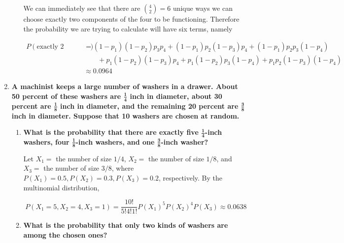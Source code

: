\documentclass[10pt, oneside]{article}   	%
\theoremstyle{definition}
\begin{document}
\begin{enumerate}[label=8.\arabic*]
\begin{enumerate}
	We can immediately see that there are $\binom{4}{2} = 6$ unique ways we can choose exactly two components of the four to be functioning. Therefore the probability we are trying to calculate will have six terms, namely
	
	\begin{align*}
	P(\text{exactly 2 components are functioning}) &= (1-p_1)(1-p_2) p_3 p_4 + (1-p_1) p_2 (1-p_3) p_4 + (1-p_1) p_2 p_3 (1-p_4) \\
	&\quad \quad + p_1 (1-p_2) (1-p_3) p_4 + p_1 (1-p_2) p_3 (1-p_4) + p_1 p_2 (1-p_3) (1 - p_4) \\
	&\approx \boxed{0.0964}
	\end{align*}
	
	
	\end{enumerate}

\item  \begin{tcolorbox}[
  colback=Cerulean!5!white,
  colframe=Cerulean!75!black]
\textbf{A machinist keeps a large number of washers in a drawer. About 50 percent of these washers are $\bm{\frac{1}{4}}$ inch in diameter, about 30 percent are $\bm{\frac{1}{8}}$ inch in diameter, and the remaining 20 percent are $\bm{\frac{3}{8}}$ inch in diameter. Suppose that 10 washers are chosen at random.}
\end{tcolorbox}

	\begin{enumerate}
	\item  \begin{tcolorbox}[
	  colback=Cerulean!5!white,
	  colframe=Cerulean!75!black]
	\textbf{What is the probability that there are exactly five $\bm{\frac{1}{4}}$-inch washers, four $\bm{\frac{1}{8}}$-inch washers, and one $\bm{\frac{3}{8}}$-inch washer?}
	\end{tcolorbox}
	
	Let $X_1 = $ the number of size $1/4$, $X_2 =$ the number of size $1/8$, and $X_3 =$ the number of size $3/8$, where $P(X_1) = 0.5, P(X_2) = 0.3, P(X_3) = 0.2$, respectively. By the multinomial distribution,
	
	\[ P(X_1 = 5, X_2 = 4, X_3 = 1) = \frac{10!}{5! 4! 1!} P(X_1)^5 P(X_2)^4 P(X_3) \approx \boxed{0.0638} \]
	
	\item  \begin{tcolorbox}[
	  colback=Cerulean!5!white,
	  colframe=Cerulean!75!black]
	\textbf{What is the probability that only two kinds of washers are among the chosen ones?}
	\end{tcolorbox}
	

\end{enumerate}
\end{enumerate}
\end{document}
